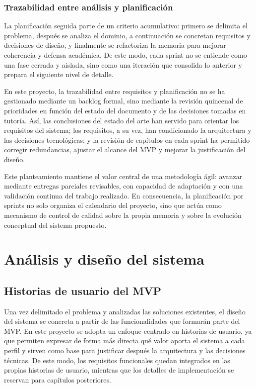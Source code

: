 \documentclass[12pt,a4paper]{report}
\begin{document}
\subsection{Trazabilidad entre análisis y planificación}
La planificación seguida parte de un criterio acumulativo: primero se delimita el problema, después se analiza el dominio, a continuación se concretan requisitos y decisiones de diseño, y finalmente se refactoriza la memoria para mejorar coherencia y defensa académica. De este modo, cada sprint no se entiende como una fase cerrada y aislada, sino como una iteración que consolida lo anterior y prepara el siguiente nivel de detalle.

En este proyecto, la trazabilidad entre requisitos y planificación no se ha gestionado mediante un backlog formal, sino mediante la revisión quincenal de prioridades en función del estado del documento y de las decisiones tomadas en tutoría. Así, las conclusiones del estado del arte han servido para orientar los requisitos del sistema; los requisitos, a su vez, han condicionado la arquitectura y las decisiones tecnológicas; y la revisión de capítulos en cada sprint ha permitido corregir redundancias, ajustar el alcance del MVP y mejorar la justificación del diseño.

Este planteamiento mantiene el valor central de una metodología ágil: avanzar mediante entregas parciales revisables, con capacidad de adaptación y con una validación continua del trabajo realizado. En consecuencia, la planificación por sprints no solo organiza el calendario del proyecto, sino que actúa como mecanismo de control de calidad sobre la propia memoria y sobre la evolución conceptual del sistema propuesto.

\chapter{Análisis y diseño del sistema}

\section{Historias de usuario del MVP}
Una vez delimitado el problema y analizadas las soluciones existentes, el diseño del sistema se concreta a partir de las funcionalidades que formarán parte del MVP. En este proyecto se adopta un enfoque centrado en historias de usuario, ya que permiten expresar de forma más directa qué valor aporta el sistema a cada perfil y sirven como base para justificar después la arquitectura y las decisiones técnicas. De este modo, los requisitos funcionales quedan integrados en las propias historias de usuario, mientras que los detalles de implementación se reservan para capítulos posteriores.
\end{document}
